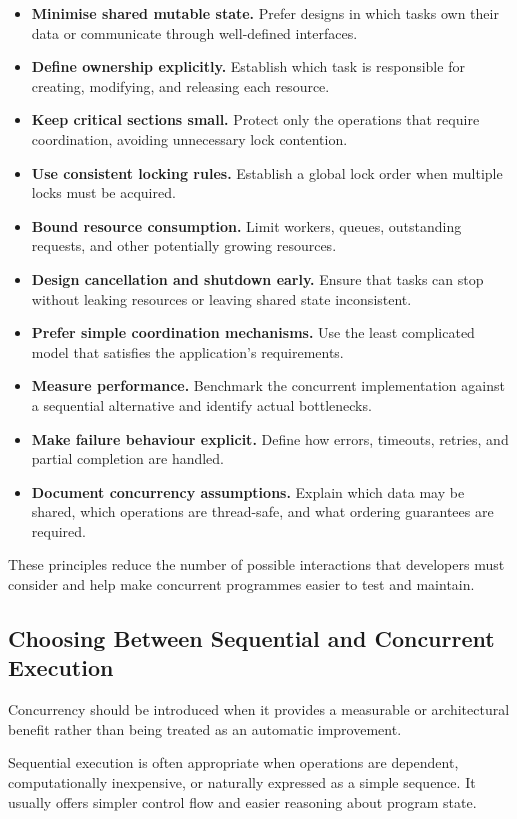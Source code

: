 \begin{itemize}
    \item \textbf{Minimise shared mutable state.} Prefer designs in which tasks own their data or communicate through well-defined interfaces.
    \item \textbf{Define ownership explicitly.} Establish which task is responsible for creating, modifying, and releasing each resource.
    \item \textbf{Keep critical sections small.} Protect only the operations that require coordination, avoiding unnecessary lock contention.
    \item \textbf{Use consistent locking rules.} Establish a global lock order when multiple locks must be acquired.
    \item \textbf{Bound resource consumption.} Limit workers, queues, outstanding requests, and other potentially growing resources.
    \item \textbf{Design cancellation and shutdown early.} Ensure that tasks can stop without leaking resources or leaving shared state inconsistent.
    \item \textbf{Prefer simple coordination mechanisms.} Use the least complicated model that satisfies the application's requirements.
    \item \textbf{Measure performance.} Benchmark the concurrent implementation against a sequential alternative and identify actual bottlenecks.
    \item \textbf{Make failure behaviour explicit.} Define how errors, timeouts, retries, and partial completion are handled.
    \item \textbf{Document concurrency assumptions.} Explain which data may be shared, which operations are thread-safe, and what ordering guarantees are required.
\end{itemize}

These principles reduce the number of possible interactions that developers must consider and help make concurrent programmes easier to test and maintain.

\subsection{Choosing Between Sequential and Concurrent Execution}

Concurrency should be introduced when it provides a measurable or architectural benefit rather than being treated as an automatic improvement.

Sequential execution is often appropriate when operations are dependent, computationally inexpensive, or naturally expressed as a simple sequence. It usually offers simpler control flow and easier reasoning about program state.

